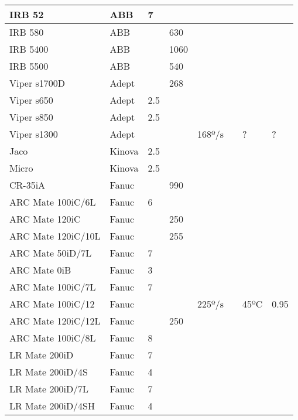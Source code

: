 \begin{longtable}{|p{}|p{}|p{}|p{}|p{}|p{}|p{}|p{}|}
IRB 52 & ABB & \cellcolor{red} 7 &  &  &  &  &  \\ \hline
IRB 580 & ABB &  & \cellcolor{red} 630 &  &  &  &  \\ \hline
IRB 5400 & ABB &  & \cellcolor{red} 1060 &  &  &  &  \\ \hline
IRB 5500 & ABB &  & \cellcolor{red} 540 &  &  &  &  \\ \hline
Viper s1700D & Adept &  & \cellcolor{red} 268 &  &  &  &  \\ \hline
Viper s650 & Adept & \cellcolor{red} 2.5 &  &  &  &  &  \\ \hline
Viper s850 & Adept & \cellcolor{red} 2.5 &  &  &  &  &  \\ \hline
\cellcolor{yellow} Viper s1300 & Adept &  &  & 168º/s &  & ? & ? \\ \hline
Jaco & Kinova & \cellcolor{red} 2.5 &  &  &  &  &  \\ \hline
Micro & Kinova & \cellcolor{red} 2.5 &  &  &  &  &  \\ \hline
CR-35iA & Fanuc &  & \cellcolor{red} 990 &  &  &  &  \\ \hline
ARC Mate 100iC/6L & Fanuc & \cellcolor{red} 6 &  &  &  &  &  \\ \hline
ARC Mate 120iC & Fanuc &  & \cellcolor{red} 250 &  &  &  &  \\ \hline
ARC Mate 120iC/10L & Fanuc &  & \cellcolor{red} 255 &  &  &  &  \\ \hline
ARC Mate 50iD/7L & Fanuc & \cellcolor{red} 7 &  &  &  &  &  \\ \hline
ARC Mate 0iB & Fanuc & \cellcolor{red} 3 &  &  &  &  &  \\ \hline
ARC Mate 100iC/7L & Fanuc & \cellcolor{red} 7 &  &  &  &  &  \\ \hline
\cellcolor{green} ARC Mate 100iC/12 & Fanuc &  &  & 225º/s &  & 45ºC & \cellcolor{green} 0.95 \\ \hline
ARC Mate 120iC/12L & Fanuc &  & \cellcolor{red} 250 &  &  &  &  \\ \hline
ARC Mate 100iC/8L & Fanuc & \cellcolor{red} 8 &  &  &  &  &  \\ \hline
LR Mate 200iD & Fanuc & \cellcolor{red} 7 &  &  &  &  &  \\ \hline
LR Mate 200iD/4S & Fanuc & \cellcolor{red} 4 &  &  &  &  &  \\ \hline
LR Mate 200iD/7L & Fanuc & \cellcolor{red} 7 &  &  &  &  &  \\ \hline
LR Mate 200iD/4SH & Fanuc & \cellcolor{red} 4 &  &  &  &  &  \\ \hline

\end{longtable}
